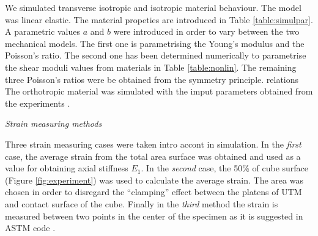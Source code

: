 \documentclass[review]{elsarticle}
\begin{document}
We simulated transverse isotropic and isotropic material behaviour.
The model was linear elastic. The material propeties are introduced in
Table \ref{table:simulpar}. A parametric values $a$ and $b$ were introduced in
order to vary between the two mechanical models. The first one is parametrising
the Young's modulus and the Poisson's ratio. The second one has
been determined numerically to parametrise the shear moduli values from
materials in Table \ref{table:nonlin}. 
The remaining three Poisson's ratios were be obtained from the symmetry
principle. relations The orthotropic material was simulated with the imput
parameters obtained from the experiments \cite{vorobyevcharacterisation}.


\begin{description}
\item{\textit{Strain measuring methods}}
\end{description}

Three strain measuring cases were taken intro accont in simulation.
In the \textit{first} case,  the average strain from the total area surface was
obtained and used as a value for obtaining axial stiffness $E_1$. In the
\textit{second} case, the 50\% of cube surface (Figure \ref{fig:experiment}) was used to calculate the
 average strain. The area was chosen in order to disregard the ``clamping''
 effect between the platens of UTM and contact surface of the cube. Finally in
 the \textit{third} method the strain is measured between two points in the center of the specimen as it is suggested in ASTM code \cite{american2009standard}.
\end{document}
